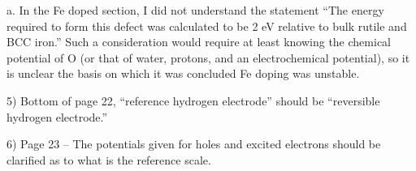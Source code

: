 a.      In the Fe doped section, I did not understand the statement “The energy required to form this defect was calculated to be 2 eV relative to bulk rutile and BCC iron.”  Such a consideration would require at least knowing the chemical potential of O (or that of water, protons, and an electrochemical potential), so it is unclear the basis on which it was concluded Fe doping was unstable.

5)       Bottom of page 22, “reference hydrogen electrode” should be “reversible hydrogen electrode.”


6)      Page 23 – The potentials given for holes and excited electrons should be clarified as to what is the reference scale.

